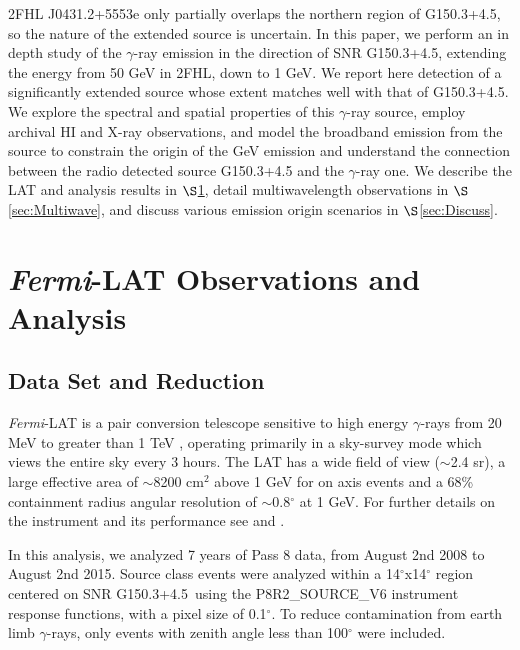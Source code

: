 \documentclass[iop]{emulateapj}
\newcommand{\gam}{$\gamma$-ray}
\newcommand{\FermiLat}{\emph{Fermi}-LAT }     %
\newcommand{\Gone}{G150.3+4.5}
\begin{document}
2FHL J0431.2+5553e only partially overlaps the northern region of \Gone{}, so the nature of the extended source is uncertain. In this paper, we perform an in depth study of the \gam{} emission in the direction of SNR \Gone{}, extending the energy from 50 GeV in 2FHL, down to 1 GeV.  We report here  detection of  a significantly extended source whose extent matches well with that of \Gone{}. We explore the spectral and spatial properties of this \gam{} source, employ archival HI and X-ray observations, and model the broadband emission from the source
to constrain the origin of the GeV emission and understand the connection between the radio detected source \Gone{} and the \gam{} one. We describe the LAT and analysis results in $\S$\ref{sec:LATobs}, detail
multiwavelength observations in $\S$\ref{sec:Multiwave}, and discuss various emission origin scenarios in $\S$\ref{sec:Discuss}.
%
%
\section{\FermiLat  Observations and  Analysis }\label{sec:LATobs}
\subsection{Data Set and Reduction}\label{sec:LATdata}
\FermiLat is a pair conversion telescope sensitive to high energy \gam{}s  from 20 MeV to greater than 1 TeV \citep{2FHL}, operating primarily in a sky-survey mode which views  the entire sky every 3 hours. The LAT has a wide field of view ($\sim$2.4 sr), a large effective area of $\sim$8200 cm$^2$ above 1 GeV for on axis events and a  68\% containment radius angular resolution  of $\sim$0.8$^\circ$  at 1 GeV. For further details  on the instrument and its performance see \cite{atwood09} and \cite{lat_perf}.

In this analysis, we  analyzed 7 years of Pass 8 data, from August 2nd 2008  to August 2nd 2015. Source class events were analyzed within a 14$^\circ$x14$^\circ$ region centered on SNR \Gone~using the P8R2\_SOURCE\_V6 instrument response functions, with a pixel size of 0.1$^{\circ}$. To reduce contamination from earth limb \gam{}s, only events with zenith angle less than 100$^{\circ}$ were included.
\end{document}
